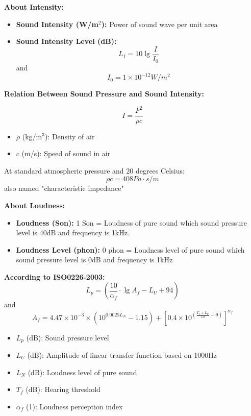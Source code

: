 \documentclass[10pt,a4paper,oneside]{beamer}
\begin{document}
\begin{frame}
\vspace{0.5cm}
{\bfseries About Intensity:}
\vspace{0.5cm}
\begin{itemize}
	\item {\bfseries Sound Intensity (W/m$^2$):} Power of sound wave per unit area
	\item {\bfseries Sound Intensity Level (dB):} 
	\[
	L_I = 10\lg\frac{I}{I_0}
	\]
	and
	\[
	I_0 = 1 \times 10^{-12}W/m^2
	\]
	
\end{itemize}
\end{frame}
\begin{frame}
\vspace{0.5cm}
{\bfseries Relation Between Sound Pressure and Sound Intensity:} 
\vspace{0.3cm}

	\[
	I = \frac{P^2}{\rho c}
	\]
\begin{itemize}
\item $\rho$ (kg/m$^3$): Density of air
\item $c$ (m/s): Speed of sound in air
\end{itemize}
\vspace{0.3cm}
At standard atmospheric pressure and 20 degrees Celsius:
\[
\rho c = 408 Pa\cdot s/m
\]
also named "characteristic impedance"
\end{frame}
\begin{frame}
\vspace{0.5cm}
{\bfseries About Loudness:} 
\vspace{0.5cm}
\begin{itemize}
\item{\bfseries Loudness (Son):} 1 Son = Loudness of pure sound which sound pressure level is 40dB and frequency is 1kHz.
\item{\bfseries Loudness Level (phon):} 0 phon = Loudness level of pure sound which sound pressure level is 0dB and frequency is 1kHz
\end{itemize}
\end{frame}
\begin{frame}
\vspace{0.5cm}
{\bfseries According to ISO0226-2003:} 
\[
L_p = (\frac{10}{\alpha _f}\cdot\lg A_f - L_U + 94)
\]
and
\[
A_f = 4.47 \times 10^{-3} \times (10^{0.0025L_N}-1.15)+[0.4\times10^{(\frac{T_f+L_U}{10}-9)}]^{\alpha_f}
\]
\begin{itemize}
	\item $L_p$ (dB): Sound pressure level
	\item  $L_U$ (dB): Amplitude of linear transfer function based on 1000Hz
	\item $L_N$ (dB): Loudness level of pure sound
	\item $T_f$ (dB): Hearing threshold
	\item $\alpha_f$ (1): Loudness perception index

\end{itemize}
\end{frame}

\begin{frame}
\vspace{0.5cm}

\end{frame}
\end{document}
